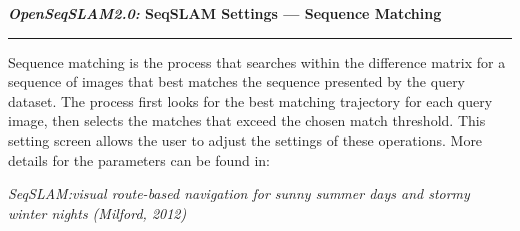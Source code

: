 \centerline{\textbf{\textit{OpenSeqSLAM2.0:} SeqSLAM Settings --- Sequence Matching}}
\noindent\rule{\textwidth}{2pt}
\bigskip
\parbox{\textwidth}{Sequence matching is the process that searches within the difference matrix for a sequence of images that best matches the sequence presented by the query dataset. The process first looks for the best matching trajectory for each query image, then selects the matches that exceed the chosen match threshold. This setting screen allows the user to adjust the settings of these operations. More details for the parameters can be found in:}
\smallskip
\parbox{\textwidth}{\textit{SeqSLAM:\@ visual route-based navigation for sunny summer days and stormy winter nights (Milford, 2012)}}
\bigskip
